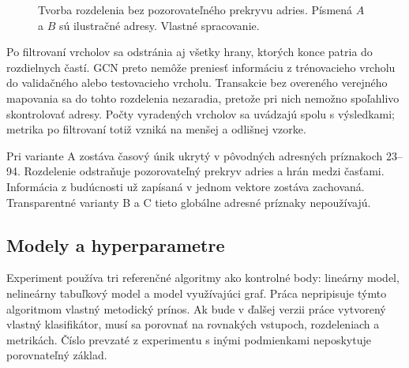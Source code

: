 \begin{figure}[htbp]
  \centering
  \caption{Tvorba rozdelenia bez pozorovateľného prekryvu adries.
  Písmená $A$ a $B$ sú ilustračné adresy. Vlastné spracovanie.}
  \label{fig:clean-split-process}
\end{figure}

Po filtrovaní vrcholov sa odstránia aj všetky hrany, ktorých konce
patria do rozdielnych častí. GCN preto nemôže preniesť informáciu z
trénovacieho vrcholu do validačného alebo testovacieho vrcholu.
Transakcie bez overeného verejného mapovania sa do tohto rozdelenia
nezaradia, pretože pri nich nemožno spoľahlivo skontrolovať adresy.
Počty vyradených vrcholov sa uvádzajú spolu s výsledkami; metrika po
filtrovaní totiž vzniká na menšej a odlišnej vzorke.

Pri variante A zostáva časový únik ukrytý v pôvodných adresných
príznakoch 23--94. Rozdelenie odstraňuje pozorovateľný prekryv adries a
hrán medzi časťami. Informácia z budúcnosti už zapísaná v jednom
vektore zostáva zachovaná. Transparentné varianty B a C tieto globálne
adresné príznaky nepoužívajú.

\subsection{Modely a hyperparametre}

Experiment používa tri referenčné algoritmy ako kontrolné body:
lineárny model, nelineárny tabuľkový model a model využívajúci graf.
Práca nepripisuje týmto algoritmom vlastný metodický prínos. Ak bude v
ďalšej verzii práce vytvorený vlastný
klasifikátor, musí sa porovnať na rovnakých vstupoch, rozdeleniach a
metrikách. Číslo prevzaté z experimentu s inými podmienkami neposkytuje
porovnateľný základ.

